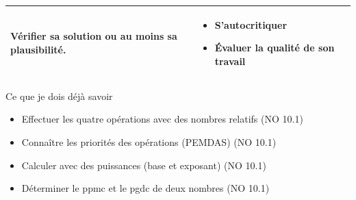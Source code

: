 \begin{tabularx}{\textwidth}{|>{\raggedright\arraybackslash}X|>{\raggedright\arraybackslash}X|}
Vérifier sa solution ou au moins sa plausibilité.
&\vspace{-1em}
\begin{itemize}[leftmargin=*, itemsep=2pt, topsep=0pt, label=$\triangleright$]
    \item S'autocritiquer
    \item Évaluer la qualité de son travail
\end{itemize} \\
\hline
\end{tabularx}
\def\arraystretch{1}
 
 
\vfill
\begin{astuce}{Ce que je dois déjà savoir}
\begin{itemize}[leftmargin=*, itemsep=2pt, topsep=2pt, label=$\triangleright$]
    \item Effectuer les \textcolor{themeNO}{quatre opérations} avec des nombres relatifs \hfill (NO 10.1)
    \item Connaître les priorités des opérations (\textcolor{themeNO}{PEMDAS}) \hfill (NO 10.1)
    \item Calculer avec des \textcolor{themeNO}{puissances} (base et exposant) \hfill (NO 10.1)
    \item Déterminer le \textcolor{themeNO}{ppmc} et le \textcolor{themeNO}{pgdc} de deux nombres \hfill (NO 10.1)
\end{itemize}
\end{astuce}

